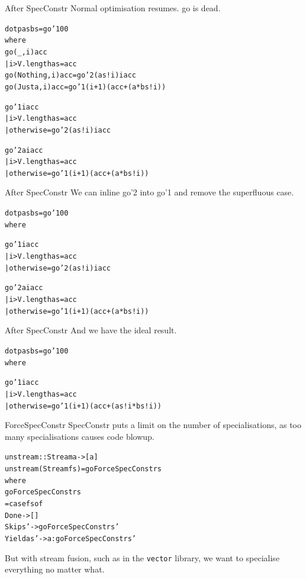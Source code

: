 \documentclass[t]{beamer}
\newcommand{\oomph}[1]{\textcolor[rgb]{0.0,0.5,0.9}{#1}}
\begin{document}
\begin{frame}[fragile]{After SpecConstr}
Normal optimisation resumes. \oomph{go} is dead.
\begin{alltt}
dotp as bs = go'1 0 0
 where
  \oomph{go (_, i) acc
   | i > V.length as  = acc
  go (Nothing, i) acc = go'2 (as!i) i acc
  go (Just a,  i) acc = go'1 (i + 1) (acc + (a * bs!i))}

  go'1 i acc 
   | i > V.length as  = acc
   | otherwise        = go'2 (as!i) i acc

  go'2 a i acc 
   | i > V.length as  = acc
   | otherwise        = go'1 (i + 1) (acc + (a * bs!i))
\end{alltt}
\end{frame}

\begin{frame}[fragile]{After SpecConstr}
We can inline \oomph{go'2} into \oomph{go'1} and remove the superfluous case.
\begin{alltt}
dotp as bs = go'1 0 0
 where





  go'1 i acc 
   | i > V.length as  = acc
   | otherwise        = \oomph{go'2 (as!i) i acc}

  go'2 a i acc 
   | i > V.length as  = acc
   \oomph{| otherwise        = go'1 (i + 1) (acc + (a * bs!i))}
\end{alltt}
\end{frame}

\begin{frame}[fragile]{After SpecConstr}
And we have the ideal result. 
\begin{alltt}
dotp as bs = go'1 0 0
 where





  go'1 i acc 
   | i > V.length as  = acc
   | otherwise        = \oomph{go'1 (i + 1) (acc + (as!i * bs!i))}
\end{alltt}
\end{frame}


\begin{frame}[fragile]{ForceSpecConstr}
SpecConstr puts a limit on the number of specialisations,
as too many specialisations causes code blowup.
\begin{alltt}
unstream :: Stream a -> [a]
unstream (Stream f s) = go \oomph{ForceSpecConstr} s
 where
  go \oomph{ForceSpecConstr} s
   = case f s of
     Done       -> []
     Skip    s' ->      go \oomph{ForceSpecConstr} s'
     Yield a s' -> a :  go \oomph{ForceSpecConstr} s'
\end{alltt}

But with stream fusion, such as in the \verb/vector/ library, we want to specialise everything no matter what.
\end{frame}
\end{document}
